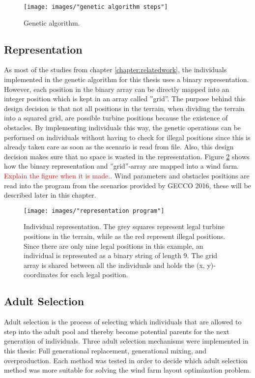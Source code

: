 \begin{figure}[h!]
\begin{center}
\texttt{[image: images/"genetic algorithm steps"]}
\caption{Genetic algorithm.}
\label{figure:genetic algorithm steps}
\end{center}
\end{figure}


\subsection{Representation}
As most of the studies from chapter \ref{chapter:relatedwork}, the individuals implemented in the genetic algorithm for this thesis uses a binary representation. However, each position in the binary array can be directly mapped into an integer position which is kept in an array called ''grid''. The purpose behind this design decision is that not all positions in the terrain, when dividing the terrain into a squared grid, are possible turbine positions because the existence of obstacles. By implementing individuals this way, the genetic operations can be performed on individuals without having to check for illegal positions since this is already taken care as soon as the scenario is read from file. Also, this design decision makes sure that no space is wasted in the representation. Figure \ref{figure:representation} shows how the binary representation and ''grid''-array are mapped into a wind farm. \textcolor{red}{Explain the figure when it is made.}. Wind parameters and obstacles positions are read into the program from the scenarios provided by GECCO 2016, these will be described later in this chapter.


\begin{figure}[h!]
\begin{center}
\texttt{[image: images/"representation program"]}
\caption{Individual representation. The grey squares represent legal turbine positions in the terrain, while as the red represent illegal positions. Since there are only nine legal positions in this example, an individual is represented as a binary string of length 9. The grid array is shared between all the individuals and holds the (x, y)-coordinates for each legal position.}
\label{figure:representation}
\end{center}
\end{figure}


\subsection{Adult Selection}\label{subsection:adult selection}
Adult selection is the process of selecting which individuals that are allowed to step into the adult pool and thereby become potential parents for the next generation of individuals. Three adult selection mechanisms were implemented in this thesis: Full generational replacement,  generational mixing, and overproduction. Each method was tested in order to decide which adult selection method was more suitable for solving the wind farm layout optimization problem. \\

